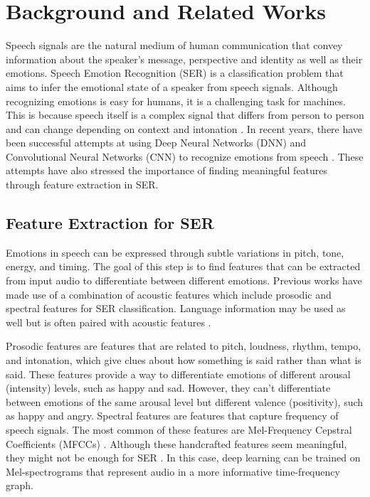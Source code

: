 \documentclass[../main.tex]{subfiles}
\begin{document}
\section{Background and Related Works} 
Speech signals are the natural medium of 
human communication that convey information about the speaker's message, 
perspective and identity as well as their emotions. Speech Emotion Recognition 
(SER) is a classification problem that aims to infer the emotional state of a 
speaker from speech signals. Although recognizing emotions is easy for humans, 
it is a challenging task for machines. This is because speech itself is a 
complex signal that differs from person to person and can change depending on 
context and intonation \citep{Hashem2023} \citep{Koduru2020}. In recent years, there have been successful attempts at 
using Deep Neural Networks (DNN) and Convolutional Neural Networks (CNN) to 
recognize emotions from speech \citep{Pham2023} \cite{Zhang2018}. These attempts have also stressed the importance 
of finding meaningful features through feature extraction in SER.

\subsection{Feature Extraction for SER} 
Emotions in speech can be expressed 
through subtle variations in pitch, tone, energy, and timing. The goal of this 
step is to find features that can be extracted from input audio to differentiate 
between different emotions. Previous works have made use of a combination of 
acoustic features which include prosodic and spectral features for SER 
classification. Language information may be used as well but is often paired 
with acoustic features \citep{Pham2023} \cite{Zhang2018}. 

Prosodic features are features that are related to 
pitch, loudness, rhythm, tempo, and intonation, which give clues about how 
something is said rather than what is said. These features provide a way to 
differentiate emotions of different arousal (intensity) levels, such as happy 
and sad. However, they can't differentiate between emotions of the same arousal 
level but different valence (positivity), such as happy and angry. Spectral 
features are features that capture frequency of speech signals. The most common 
of these features are Mel-Frequency Cepstral Coefficients (MFCCs) \citep{Hashem2023}. Although 
these handcrafted features seem meaningful, they might not be enough for SER \citep{Koduru2020}. 
In this case, deep learning can be trained on Mel-spectrograms that represent 
audio in a more informative time-frequency graph.
\end{document}
